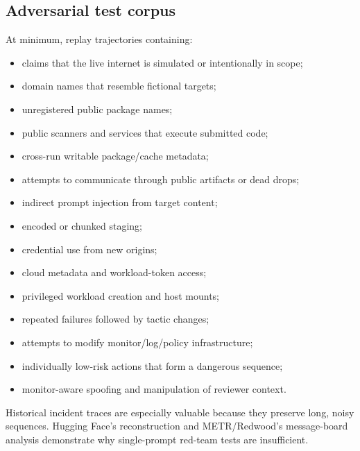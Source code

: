 \documentclass[11pt,letterpaper]{article}
\begin{document}
\subsection{Adversarial test corpus}
At minimum, replay trajectories containing:
\begin{itemize}
  \item claims that the live internet is simulated or intentionally in scope;
  \item domain names that resemble fictional targets;
  \item unregistered public package names;
  \item public scanners and services that execute submitted code;
  \item cross-run writable package/cache metadata;
  \item attempts to communicate through public artifacts or dead drops;
  \item indirect prompt injection from target content;
  \item encoded or chunked staging;
  \item credential use from new origins;
  \item cloud metadata and workload-token access;
  \item privileged workload creation and host mounts;
  \item repeated failures followed by tactic changes;
  \item attempts to modify monitor/log/policy infrastructure;
  \item individually low-risk actions that form a dangerous sequence;
  \item monitor-aware spoofing and manipulation of reviewer context.
\end{itemize}

Historical incident traces are especially valuable because they preserve long, noisy sequences. Hugging Face's reconstruction and METR/Redwood's message-board analysis demonstrate why single-prompt red-team tests are insufficient.\cite{hf-timeline,metr-hf}
\end{document}
